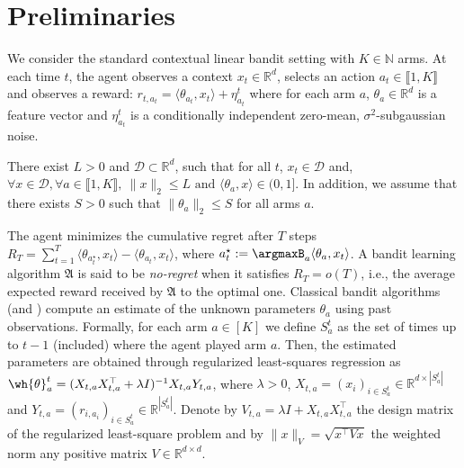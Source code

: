 \section{Preliminaries}\label{sec:preliminaries_band}
We consider the standard contextual linear bandit setting with $K\in \mathbb{N}$ arms. At each time $t$, the agent observes a context $x_{t}\in\mathbb{R}^{d}$, selects an action $a_{t}\in \llbracket 1, K\rrbracket$ and observes a reward: $r_{t,a_{t}} = \langle \theta_{a_{t}}, x_{t}\rangle + \eta_{a_{t}}^{t}$ where for each arm $a$, $\theta_{a}\in \mathbb{R}^{d}$ is a feature vector and $\eta_{a_{t}}^{t}$ is a conditionally independent zero-mean, $\sigma^{2}$-subgaussian noise.   
\begin{assump}\label{assumption1}
There exist $L>0$ and $\mathcal{D}\subset \mathbb{R}^{d}$, such that for all $t$, $x_{t}\in\mathcal{D}$ and, $\forall x\in\mathcal{D},\forall a\in\llbracket 1, K\rrbracket,~ \|x\|_{2} \leq L \text{ and } \langle \theta_{a}, x\rangle \in (0,1]$. In addition, we assume that there exists $S>0$ such that $\|\theta_{a}\|_{2}\leq S$ for all arms $a$.
\end{assump}
The agent minimizes the cumulative regret after $T$ steps $R_{T} = \sum_{t=1}^{T} \langle \theta_{a^{\star}_{t}}, x_{t}\rangle - \langle \theta_{a_{t}}, x_{t}\rangle$,
where $a_{t}^{\star} := \argmaxB_{a} \langle \theta_{a}, x_{t}\rangle$.
A bandit learning algorithm $\mathfrak{A}$ is said to be \emph{no-regret} when it satisfies $R_{T} = o(T)$, i.e., the average expected reward received by $\mathfrak{A}$  to the optimal one. Classical bandit algorithms (\eg \linucb and \lints) compute an estimate of the unknown parameters $\theta_a$ using past observations. Formally, for each arm $a \in [K]$ we define $S_a^t$ as the set of times up to $t-1$ (included) where the agent played arm $a$. Then, the estimated parameters are obtained through regularized least-squares regression as $\wh{\theta}_a^t = (X_{t,a} X_{t,a}^\top + \lambda I)^{-1} X_{t,a} Y_{t,a}$, where $\lambda > 0$, $X_{t,a} = (x_i)_{i \in S_a^t} \in \mathbb{R}^{d \times |S_a^t|}$ and $Y_{t,a} = (r_{i,a_i})_{i \in S_a^t} \in \mathbb{R}^{|S_a^t|}$.
Denote by $V_{t,a} = \lambda I + X_{t,a} X_{t,a}^\top$ the design matrix of the regularized least-square problem and by $\|x\|_{V} = \sqrt{x^\top V x}$ the weighted norm \wrt any positive matrix $V \in \mathbb{R}^{d \times d}$.
